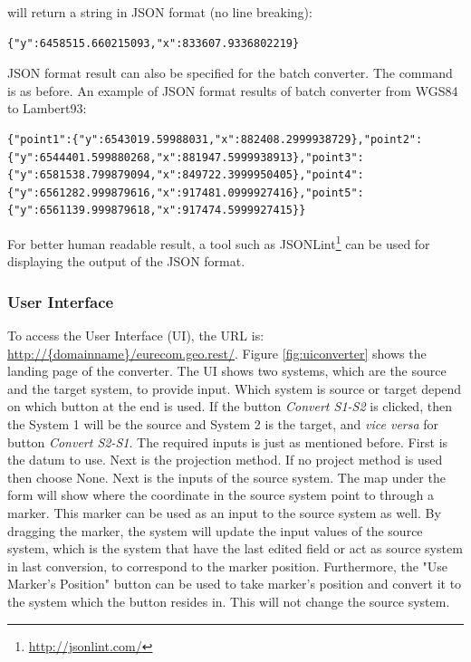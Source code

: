 will return a string in JSON format (no line breaking):
\begin{verbatim}
{"y":6458515.660215093,"x":833607.9336802219}
\end{verbatim}

JSON format result can also be specified for the batch converter. The command is as before. An example of JSON format results of batch converter from WGS84 to Lambert93:

\begin{lstlisting}
{"point1":{"y":6543019.59988031,"x":882408.2999938729},"point2":{"y":6544401.599880268,"x":881947.5999938913},"point3":{"y":6581538.799879094,"x":849722.3999950405},"point4":{"y":6561282.999879616,"x":917481.0999927416},"point5":{"y":6561139.999879618,"x":917474.5999927415}}
\end{lstlisting}

For better human readable result, a tool such as JSONLint\footnote{ \url{http://jsonlint.com/}} can be used for displaying the output of the JSON format.


\subsubsection{User Interface}
To access the User Interface (UI), the URL is: \url{http://{domainname}/eurecom.geo.rest/}. Figure \ref{fig:uiconverter} shows the landing page of the converter. The UI shows two systems, which are the source and the target system, to provide input. Which system is source or target depend on which button at the end is used. If the button \textit{Convert S1-S2} is clicked, then the System 1 will be the source and System 2 is the target, and \textit{vice versa} for button \textit{Convert S2-S1}.
The required inputs is just as mentioned before. First is the datum to use. Next is the projection method. If no project method is used then choose None. Next is the inputs of the source system.
The map under the form will show where the coordinate in the source system point to through a marker. This marker can be used as an input to the source system as well.
By dragging the marker, the system will update the input values of the source system, which is the system that have the last edited field or act as source system in last conversion, to correspond to the marker position. Furthermore, the "Use Marker's Position" button can be used to take marker's position and convert it to the system which the button resides in. This will not change the source system.


